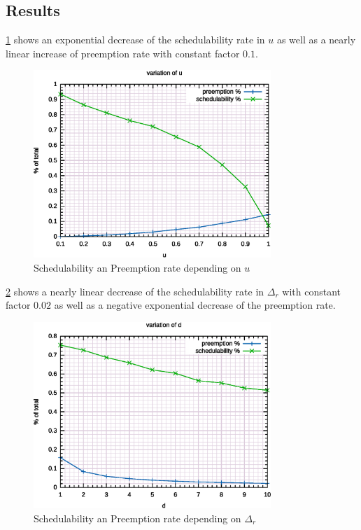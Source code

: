\subsection{Results}



\ref{fig:stu:au} shows an exponential decrease of the schedulability rate in $u$ as well as a nearly linear increase of preemption rate with constant factor $0.1$.

\begin{figure}
	\centering
	\includegraphics[width=0.8\textwidth]{../gnuplot/eps/1}
	\caption{\label{fig:stu:au} Schedulability an Preemption rate depending on $u$}
\end{figure}


\ref{fig:stu:ad} shows a nearly linear decrease of the schedulability rate in $\Delta_r$ with constant factor $0.02$ as well as a negative exponential decrease of the preemption rate.

\begin{figure}
	\centering
	\includegraphics[width=0.8\textwidth]{../gnuplot/eps/2}
	\caption{\label{fig:stu:ad} Schedulability an Preemption rate depending on $\Delta_r$}
\end{figure}

